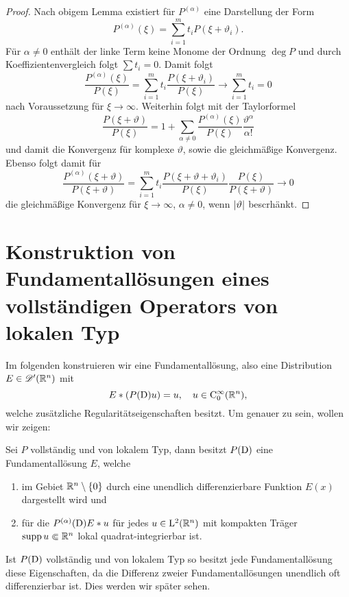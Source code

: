 \begin{proof}
Nach obigem Lemma existiert für $P^{(\alpha)}$ eine Darstellung der Form
\begin{equation}
P^{(\alpha)}(\xi)=\sum_{i=1}^m t_i P(\xi+\vartheta_i).
\end{equation}
Für $\alpha\neq0$ enthält der linke Term keine Monome der Ordnung $\deg P$ und durch Koeffizientenvergleich folgt $\sum t_i=0$. Damit folgt
\begin{equation}
\dfrac{P^{(\alpha)}(\xi)}{P(\xi)}=\sum_{i=1}^m t_i\dfrac{P(\xi+\vartheta_i)}{P(\xi)} \rightarrow \sum_{i=1}^m t_i=0
\end{equation}
nach Voraussetzung für $\xi\to\infty$. Weiterhin folgt mit der Taylorformel
\begin{equation}
\dfrac{P(\xi+\vartheta)}{P(\xi)}=1+\sum_{\alpha\neq 0} \dfrac{P^{(\alpha)}(\xi)}{P(\xi)}\dfrac{\vartheta^\alpha}{\alpha!}
\end{equation}
und damit die Konvergenz für komplexe $\vartheta$, sowie die gleichmäßige Konvergenz. Ebenso folgt damit für
\begin{equation}
\dfrac{P^{(\alpha)}(\xi+\vartheta)}{P(\xi+\vartheta)}=\sum_{i=1}^mt_i\dfrac{P(\xi+\vartheta+\vartheta_i)}{P(\xi)}\dfrac{P(\xi)}{P(\xi+\vartheta)} \rightarrow 0
\end{equation}
die gleichmäßige Konvergenz für $\xi\to\infty$, $\alpha\neq0$, wenn $\lvert\vartheta\rvert$ bescrhänkt.
\end{proof}

\section{Konstruktion von Fundamentallösungen eines vollständigen Operators von lokalen Typ} %

Im folgenden konstruieren wir eine Fundamentallösung, also eine Distribution $E\in\mathscr D'(\mathbb R^n)$ mit
\begin{equation}
E*(P(\mathrm D) u) = u, \quad u \in \mathrm C_0^\infty(\mathbb R^n),
\end{equation}
welche zusätzliche Regularitätseigenschaften besitzt.
Um genauer zu sein,  wollen wir zeigen:
\begin{thm}\label{fundamental_exist}
Sei $P$ vollständig und von lokalem Typ, dann besitzt $P(\mathrm D)$ eine Fundamentallösung $E$, welche 
\begin{enumerate}
\item im Gebiet $\mathbb R^n\setminus\{0\}$  durch eine unendlich differenzierbare Funktion $E(x)$ dargestellt wird und
\item für die $P^{(\alpha)}(\mathrm D) E*u$ für jedes $u\in \mathrm L^2(\mathbb R^n)$ mit kompakten Träger $\operatorname{supp} u\Subset\mathbb R^n$ lokal quadrat-integrierbar ist. 
\end{enumerate}
\end{thm}
\begin{rem}
Ist $P(\mathrm D)$ vollständig und von lokalem Typ so besitzt jede Fundamentallösung diese Eigenschaften, da die Differenz zweier Fundamentallösungen unendlich oft differenzierbar ist. Dies werden wir später sehen.
\end{rem}


